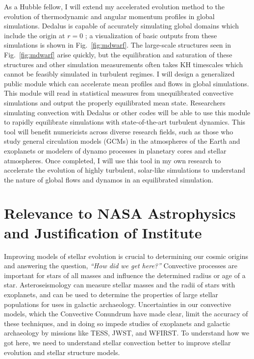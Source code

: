 \documentclass[11pt, preprint, hmargin=1in, vmargin=1in]{aastex62}
\begin{document}
As a Hubble fellow, I will extend my accelerated evolution method to the evolution of thermodynamic and angular momentum profiles in global simulations.
Dedalus is capable of accurately simulating global domains which include the origin at $r = 0$ \citep{lecoanet&all2019}; a visualization of basic outputs from these simulations is shown in Fig.~\ref{fig:mdwarf}.
The large-scale structures seen in Fig.~\ref{fig:mdwarf} arise quickly, but the equilibration and saturation of these structures and other simulation measurements often takes KH timescales which cannot be feasibly simulated in turbulent regimes.
I will design a generalized public module which can accelerate mean profiles and flows in global simulations.
This module will read in statistical measures from unequilibrated convective simulations and output the properly equilibrated mean state.
Researchers simulating convection with Dedalus or other codes will be able to use this module to rapidly equilibrate simulations with state-of-the-art turbulent dynamics.
This tool will benefit numericists across diverse research fields, such as those who study general circulation models (GCMs) in the atmospheres of the Earth and exoplanets or modelers of dynamo processes in planetary cores and stellar atmospheres.
Once completed, I will use this tool in my own research to accelerate the evolution of highly turbulent, solar-like simulations to understand the nature of global flows and dynamos in an equilibrated simulation.


\section*{Relevance to NASA Astrophysics and Justification of Institute}
Improving models of stellar evolution is crucial to determining our cosmic origins and answering the question, \emph{``How did we get here?''}
Convective processes are important for stars of all masses and influence the determined radius or age of a star.
Asteroseismology can measure stellar masses and the radii of stars with exoplanets, and can be used to determine the properties of large stellar populations for uses in galactic archaeology.
Uncertainties in our convective models, which the Convective Conundrum have made clear, limit the accuracy of these techniques, and in doing so impede studies of exoplanets and galactic archaeology by missions like TESS, JWST, and WFIRST.
To understand how we got here, we need to understand stellar convection better to improve stellar evolution and stellar structure models.
\end{document}
